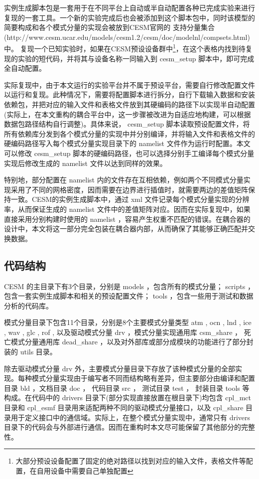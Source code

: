 实例生成脚本包是一套用于在不同平台上自动或半自动配置各种已完成实验来进行复现的一套工具。一个新的实验完成后也会被添加到这个脚本包中，同时该模型的简要构成和各个模式分量的实现会被放到CESM官网的
支持分量集合
(http://www.cesm.ucar.edu/models/cesm1.2/cesm/doc/modelnl/compsets.html)
中。
复现一个已知实验时，如果在CESM预设设备群中\footnote{大部分预设设备配置了固定的绝对路径以找到对应的输入文件，表格文件等配置，在自用设备中需要自己单独配置}，在这个表格内找到待复现的实验的短代码，并将其与设备名称一同输入到 cesm\_setup 脚本中，即可完成全自动配置。

实际复现中，由于本文运行的实验平台并不属于预设平台，需要自行修改配置文件以运行和复现。此种情况下，需要将配置脚本进行拆分，自行下载输入数据和安装依赖包，并把对应的输入文件和表格文件放到其硬编码的路径下以实现半自动配置(实际上，在本文重构的耦合平台中，这一步骤被改进为自适应地构建，可以根据数据包路径结构自行调整)。具体来说， cesm\_setup 脚本读取预设配置文件，将所有依赖库分发到各个模式分量的实现中并分别编译，并将输入文件和表格文件的硬编码路径写入每个模式分量实现目录下的 namelist 文件作为运行时配置。本文可以修改 cesm\_setup 脚本的硬编码路径，也可以选择分别手工编译每个模式分量实现后修改生成的 namelist 文件以达到同样的效果。

特别地，部分配置在 namelist 内的文件存在互相依赖，例如两个不同模式分量实现采用了不同的网格密度，因而需要在边界进行插值时，就需要两边的差值矩阵保持一致。CESM的实例生成脚本中，通过 xml 文件记录每个模式分量实现的分辨率，从而保证生成的 namelist 文件中的差值矩阵对应。因而在实际复现中，如果直接采用分别构建时使用的 namelist ，容易产生权重不匹配的错误。在耦合器的设计中，本文将这一部分完全包装在耦合器内部，从而确保了其能够正确匹配并交换数据。

\subsection{代码结构}

CESM 的主目录下有3个目录，分别是 models ，包含所有的模式分量； scripts ，包含一套实例生成脚本和相关的预设配置文件； tools ，包含一些用于测试和数据分析的代码库。

模式分量目录下包含11个目录，分别是8个主要模式分量类型 atm , ocn , lnd , ice , wav , glc , rof , 以及驱动模式分量 drv ，模式分量实现通用库 csm\_share ， 死亡模式分量通用库 dead\_share ，以及对外部库或部分成模块的功能进行了部分封装的 utils 目录。

除去驱动模式分量 drv 外，主要模式分量目录下存放了该种模式分量的全部实现。每种模式分量实现由于编写者不同而结构略有差异，但主要部分由编译和配置目录 bld ，文档目录 doc ， 代码目录 src ， 测试目录 test ， 封装目录 tools 等构成。在代码中的 drivers 目录下(部分实现直接放置在根目录下)均包含 cpl\_mct 目录和 cpl\_esmf 目录用来适配两种不同的驱动模式分量接口，以及 cpl\_share 目录用于定义接口中的通信域。实际上，在整个模式分量实现中，通常只有  drivers 目录下的代码会与外部进行通信。因而在重构时本文尽可能保留了其他部分的完整性。

